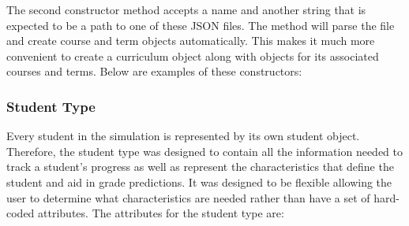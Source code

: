 \documentclass[botnum, fleqn]{unmeethesis}
\begin{document}
      

      The second constructor method accepts a name and another string that is expected to be a path to one of these JSON files. The method will parse the file and create course and term objects automatically. This makes it much more convenient to create a curriculum object along with objects for its associated courses and terms. Below are examples of these constructors:

      

    \subsubsection{Student Type}
      Every student in the simulation is represented by its own student object. Therefore, the student type was designed to contain all the information needed to track a student's progress as well as represent the characteristics that define the student and aid in grade predictions. It was designed to be flexible allowing the user to determine what characteristics are needed rather than have a set of hard-coded attributes. The attributes for the student type are:
\end{document}
